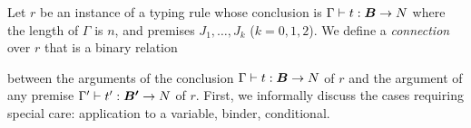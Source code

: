 %
%


Let $r$ be an instance of a typing rule whose conclusion is $\Gamma \vdash t:\vec{B} \rightarrow \N$
where the length of $\Gamma$ is $n$, 
and premises $J_1,\ldots,J_k$ ($k=0,1,2$). 
We define a \emph{connection} over $r$ that is a binary relation

between the arguments of the conclusion $\Gamma \vdash t:\vec{B} 
\rightarrow \N$ of $r$ and the argument of any premise $\Gamma' \vdash t':\vec{B'} 
\rightarrow \N$ of $r$. First, we informally discuss the cases requiring special care:
application to a variable, binder, conditional.

